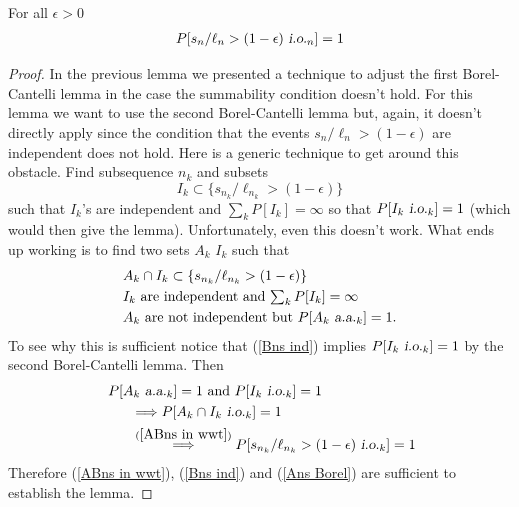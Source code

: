 \begin{lemma}
\label{LIIL: io lemma 2}
For all $\epsilon >0 $
\begin{align*}
P[ s_n/\ell_n > (1-\epsilon) {\,\,\text{\sl i.o.} }_n ] = 1
\end{align*}
\end{lemma}
\begin{proof}
In the previous lemma we presented a technique to adjust the first Borel-Cantelli lemma in the case the summability condition doesn't hold. For this  lemma we want to use the second Borel-Cantelli lemma but, again, it doesn't directly apply since the condition that the events $s_n/\ell_n > (1-\epsilon)$ are independent does not hold. Here is a generic technique to get around this obstacle. Find subsequence $n_k$ and subsets
\[
I_k \subset   \{s_{n_k}/\ell_{n_k} > (1-\epsilon)\}
\]
such that $I_k$'s  are independent and $\sum_k P[I_k]=\infty$ so that $P[I_k {\,\,\text{\sl i.o.} }_k]=1$ (which would then give the lemma). Unfortunately, even this doesn't work. What ends up working is to find two sets $A_k$ $I_k$ such that
\begin{align}
&A_k\cap I_k \subset \{s_{n_k}/\ell_{n_k} > (1-\epsilon)\}  \label{ABns in wwt}\\
&\text{$I_k$ are independent and $\textstyle\sum_k P[I_k]=\infty$} \label{Bns ind}\\
&\text{$A_k$ are not independent but $P[A_k {\,\,\text{\sl a.a.} }_k] = 1$.}\label{Ans Borel}
\end{align}
To see why this is sufficient notice that (\ref{Bns ind}) implies $P[I_k {\,\,\text{\sl i.o.} }_k] = 1$ by the second Borel-Cantelli lemma. Then
\begin{align*}
&\text{ $P[A_k {\,\,\text{\sl a.a.} }_k] = 1$ and $P[I_k {\,\,\text{\sl i.o.} }_k]=1$ } \\
&\qquad\Longrightarrow P[A_k \cap I_k {\,\,\text{\sl i.o.} }_k] = 1 \\
&\qquad\overset{(\ref{ABns in wwt})}\Longrightarrow  P[s_{n_k}/\ell_{n_k} > (1-\epsilon) {\,\,\text{\sl i.o.} }_k] = 1
\end{align*}
Therefore (\ref{ABns in wwt}), (\ref{Bns ind}) and (\ref{Ans Borel}) are sufficient to establish the lemma.


\end{proof}

